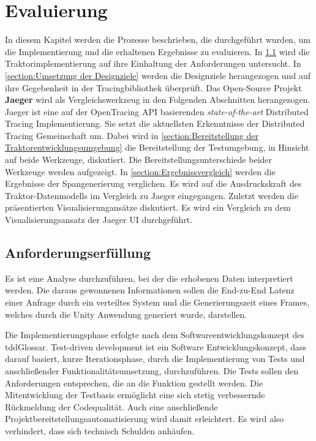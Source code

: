 %

\chapter{Evaluierung}
\label{chapter:Evaluierung}
In diesem Kapitel werden die Prozesse beschrieben, die durchgeführt wurden, um die Implementierung und die erhaltenen Ergebnisse zu evaluieren. In \cref{section:Anforderungserfüllung} wird die Traktorimplementierung auf ihre Einhaltung der Anforderungen  untersucht. In \cref{section:Umsetzung der Designziele} werden die Designziele herangezogen und auf ihre Gegebenheit in der Tracingbibliothek überprüft. Das Open-Source Projekt \textbf{Jaeger} wird als Vergleichswerkzeug in den Folgenden Abschnitten herangezogen. Jaeger ist eine auf der OpenTracing API basierenden \emph{state-of-the-art} Distributed Tracing Implementierung. Sie setzt die aktuellsten Erkenntnisse der Distributed Tracing Gemeinschaft um. Dabei wird in \cref{section:Bereitstellung der Traktorentwicklungsumgebung} die Bereitstellung der Testumgebung, in Hinsicht auf beide Werkzeuge, diskutiert. Die Bereitstellungsunterschiede beider Werkzeuge werden aufgezeigt. In \cref{section:Ergebnissvergleich} werden die Ergebnisse der Spangenerierung verglichen. Es wird auf die Ausdruckskraft des Traktor-Datenmodells im Vergleich zu Jaeger eingegangen. Zuletzt werden die präsentierten Visualisierungansätze diskutiert. Es wird ein Vergleich zu dem Visualisierungsansatz der Jaeger UI durchgeführt.

\section{Anforderungserfüllung}
\label{section:Anforderungserfüllung}

Es ist eine Analyse durchzuführen, bei der die erhobenen Daten interpretiert werden. Die daraus gewonnenen Informationen sollen die End-zu-End Latenz einer Anfrage durch ein verteiltes System und die Generierungszeit eines Frames, welches durch die Unity Anwendung generiert wurde, darstellen. 

Die Implementierungsphase erfolgte nach dem Softwareentwicklungskonzept des \gls{tddGlossar}. Test-driven development ist ein Software Entwicklungskonzept, dass darauf basiert, kurze Iterationsphase, durch die Implementierung von Tests und anschließender Funktionalitätsumsetzung, durchzuführen. Die Tests sollen den Anforderungen entsprechen, die an die Funktion gestellt werden. Die Mitentwicklung der Testbasis ermöglicht eine sich stetig verbessernde Rückmeldung der Codequalität. Auch eine anschließende Projektbereitstellungsautomatisierung wird damit erleichtert. Es wird also verhindert, dass sich technisch Schulden anhäufen.

